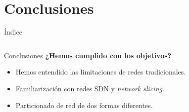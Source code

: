 \documentclass{beamer}
\begin{document}
\section{Conclusiones}
\begin{frame}{Índice}
    \begin{columns}[t]
        \begin{column}{1.7in}
            \tableofcontents[currentsection, hideallsubsections, sections={1-4}]
        \end{column}
        \begin{column}{1.7in}
            \tableofcontents[currentsection, hideallsubsections, sections={5-7}]
        \end{column}
    \end{columns}
\end{frame}

\begin{frame}{Conclusiones}
    \textbf{¿Hemos cumplido con los objetivos?}\vspace{10pt}
    \begin{itemize}
        \item Hemos entendido las limitaciones de redes tradicionales.
        \item Familiarización con redes SDN y \textit{network slicing}.
        \item Particionado de red de dos formas diferentes.
    \end{itemize}\vspace{20pt}

\end{frame}
\end{document}
